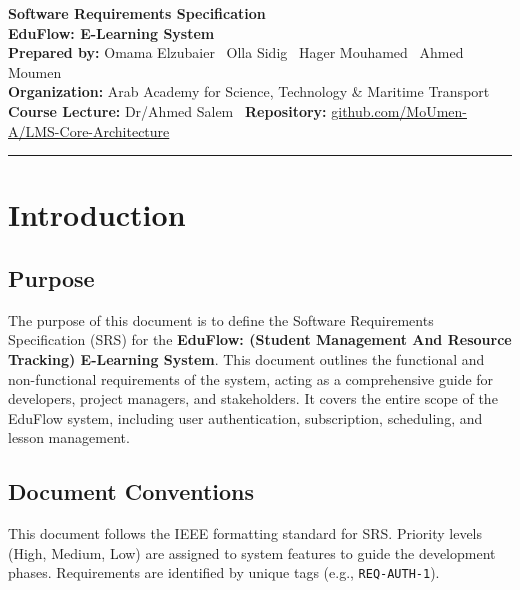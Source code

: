 \documentclass[11pt,a4paper]{article}
\begin{document}
\begin{center}
    {\Huge \textbf{Software Requirements Specification}} \\
    \vspace{0.3cm}
    {\LARGE \textbf{EduFlow: E-Learning System}} \\
    \vspace{0.6cm}
    \textbf{Prepared by:} Omama Elzubaier \textperiodcentered\ Olla Sidig \textperiodcentered\ Hager Mouhamed \textperiodcentered\ Ahmed Moumen \\
    \vspace{0.2cm}
    \textbf{Organization:} Arab Academy for Science, Technology \& Maritime Transport \\
    \textbf{Course Lecture:} Dr/Ahmed Salem \textperiodcentered\ \textbf{Repository:} \href{https://github.com/MoUmen-A/LMS-Core-Architecture}{github.com/MoUmen-A/LMS-Core-Architecture} \\
    \vspace{0.4cm}
    \hrule
\end{center}

\tableofcontents
\newpage

\section{Introduction}

\subsection{Purpose}
The purpose of this document is to define the Software Requirements Specification (SRS) for the \textbf{EduFlow: (Student Management And Resource Tracking) E-Learning System}. This document outlines the functional and non-functional requirements of the system, acting as a comprehensive guide for developers, project managers, and stakeholders. It covers the entire scope of the EduFlow system, including user authentication, subscription, scheduling, and lesson management.

\subsection{Document Conventions}
This document follows the IEEE formatting standard for SRS. Priority levels (High, Medium, Low) are assigned to system features to guide the development phases. Requirements are identified by unique tags (e.g., \texttt{REQ-AUTH-1}).
\end{document}
